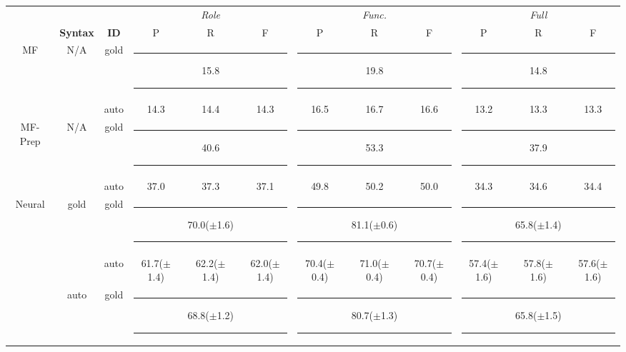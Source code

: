 \begin{table}[]
    \newcommand{\score}[2]{#1{\tiny ($\pm$#2)}}
    \newcommand{\acc}[1]{\multicolumn{3}{c|}{\textcolor{gray}{\rule[2pt]{0.5in}{0.5pt}} #1 \textcolor{gray}{\rule[2pt]{0.5in}{0.5pt}}}}
    \newcommand{\accl}[1]{\multicolumn{3}{c}{\textcolor{gray}{\rule[2pt]{0.5in}{0.5pt}} #1 \textcolor{gray}{\rule[2pt]{0.5in}{0.5pt}}}}
    \newcommand{\accs}[1]{\multicolumn{3}{c|}{\textcolor{gray}{\rule[2pt]{0.3in}{0.5pt}} #1 \textcolor{gray}{\rule[2pt]{0.3in}{0.5pt}}}}
    \newcommand{\accsl}[1]{\multicolumn{3}{c}{\textcolor{gray}{\rule[2pt]{0.3in}{0.5pt}} #1 \textcolor{gray}{\rule[2pt]{0.3in}{0.5pt}}}}

	\centering\footnotesize
    \setlength{\tabcolsep}{1pt} %
    \renewcommand{\arraystretch}{1} %
	\begin{tabular}{@{}ccc<{\hspace{5pt}}ccc|ccc|ccc@{}}
                          & &          & \multicolumn{3}{c}{\textit{Role}} & \multicolumn{3}{c}{\textit{Func.}} & \multicolumn{3}{c}{\textit{Full}}              \\
                          & \textbf{Syntax} & \textbf{ID}       & P                                 & R                                  & F    & P    & R    & F    & P    & R    & F    \\
		\midrule
        \multirow{2}{*}{MF} & \multirow{2}{*}{N/A} & gold & \acc{15.8} & \acc{19.8} & \accl{14.8} \\
          &   & auto & 14.3 & 14.4 & 14.3 & 16.5 & 16.7 & 16.6 & 13.2 & 13.3 & 13.3 \\
        \midrule
        \multirow{2}{*}{MF-Prep} & \multirow{2}{*}{N/A} & gold & \acc{40.6} & \acc{53.3} & \accl{37.9} \\
          &   & auto & 37.0 & 37.3 & 37.1 & 49.8 & 50.2 & 50.0 & 34.3 & 34.6 & 34.4 \\        \midrule
        \multirow{4}{*}{Neural}        & \multirow{2}{*}{gold} & gold & \accs{\score{70.0}{1.6}}& \accs{\score{81.1}{0.6}}& \accsl{\score{65.8}{1.4}}\\
         &   & auto & \score{61.7}{1.4} & \score{62.2}{1.4} & \score{62.0}{1.4} & \score{70.4}{0.4} & \score{71.0}{0.4} & \score{70.7}{0.4} & \score{57.4}{1.6} & \score{57.8}{1.6} & \score{57.6}{1.6} \\
         \cmidrule{2-12}                & \multirow{2}{*}{auto} & gold & \accs{\score{68.8}{1.2}} & \accs{\score{80.7}{1.3}}& \accsl{\score{65.8}{1.5}}\\

\end{tabular}
\end{table}
